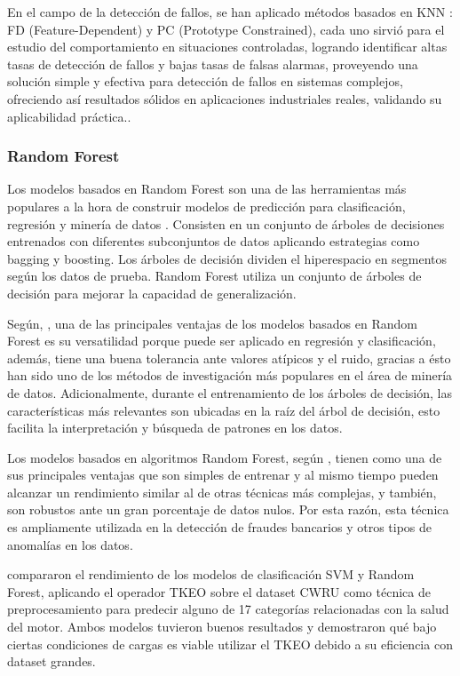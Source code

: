 \documentclass[11pt,a4paper,spanish]{book}
\numberwithin{equation}{chapter}
\numberwithin{figure}{chapter}
\begin{document}
En el campo de la detección de fallos, se han aplicado métodos basados en KNN : FD (Feature-Dependent) y PC (Prototype Constrained), cada uno sirvió para el estudio del comportamiento en situaciones controladas, logrando identificar altas tasas de detección de fallos y bajas tasas de falsas alarmas, proveyendo una solución simple y efectiva para detección de fallos en sistemas complejos, ofreciendo así resultados sólidos en aplicaciones industriales reales, validando su aplicabilidad práctica.\cite{zhou2015faultdetection}.


\subsubsection{Random Forest}


Los modelos basados en Random Forest son una de las herramientas más populares a la hora de construir modelos de predicción para clasificación, regresión y minería de datos \cite{rushall2013rf}. Consisten en un conjunto de árboles de decisiones entrenados con diferentes subconjuntos de datos aplicando estrategias como bagging y boosting. Los árboles de decisión dividen el hiperespacio en segmentos según los datos de prueba. Random Forest utiliza un conjunto de árboles de decisión para mejorar la capacidad de generalización.  


Según, \cite{salman2024rf}, una de las principales ventajas de los modelos basados en Random Forest es su versatilidad porque puede ser aplicado en regresión y clasificación,  además, tiene una buena tolerancia ante valores atípicos y el ruido, gracias a ésto han sido uno de los métodos de investigación más populares en el área de minería de datos. Adicionalmente, durante el entrenamiento de los árboles de decisión, las características más relevantes son ubicadas en la raíz del árbol de decisión, esto facilita la interpretación y búsqueda de patrones en los datos. 


Los modelos basados en algoritmos Random Forest, según \cite{canovas2017random}, tienen como una de sus principales ventajas que son simples de entrenar y al mismo tiempo pueden alcanzar un rendimiento similar al de otras técnicas más complejas, y también, son robustos ante un gran porcentaje de datos nulos. Por esta razón, esta técnica es ampliamente utilizada en la detección de fraudes bancarios y otros tipos de anomalías en los datos. 


\cite{yu2025tkeo} compararon el rendimiento de los modelos de clasificación SVM  y Random Forest, aplicando el operador TKEO sobre el dataset CWRU como técnica de preprocesamiento para predecir alguno de 17 categorías relacionadas con la salud del motor. Ambos modelos tuvieron buenos resultados y demostraron qué bajo ciertas condiciones de cargas es viable utilizar el TKEO debido a su eficiencia con dataset grandes.
\end{document}
